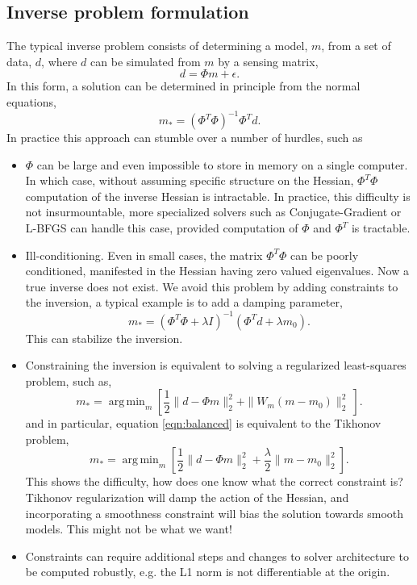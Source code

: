 \documentclass[12pt]{article}
\DeclareMathOperator*{\argmin}{arg\,min}
\begin{document}
\subsection{Inverse problem formulation}\label{sec:foundation}
The typical inverse problem consists of determining a model, $m$, from a set of data, $d$, where $d$ can be simulated from $m$ by a sensing matrix,
\begin{equation}
d=\Phi m + \epsilon.\label{eqn:formulate_d}
\end{equation}
In this form, a solution can be determined in principle from the normal equations,
\begin{equation}
m_{*}=(\Phi^T\Phi)^{-1}\Phi^T d.
\end{equation}
In practice this approach can stumble over a number of hurdles, such as
\begin{itemize}
\item $\Phi$ can be large and even impossible to store in memory on a single computer. In which case, without assuming specific structure on the Hessian, $\Phi^T\Phi$ computation of the inverse Hessian is intractable. In practice, this difficulty is not insurmountable, more specialized solvers such as Conjugate-Gradient or L-BFGS can handle this case, provided computation of $\Phi$ and $\Phi^T$ is tractable.
\item Ill-conditioning. Even in small cases, the matrix $\Phi^T\Phi$ can be poorly conditioned, manifested in the Hessian having zero valued eigenvalues. Now a true inverse does not exist. We avoid this problem by adding constraints to the inversion, a typical example is to add a damping parameter,
\begin{equation}
m_{*}=(\Phi^T\Phi+\lambda I)^{-1}(\Phi^T d+\lambda m_0).\label{eqn:balanced}
\end{equation}
This can stabilize the inversion.
\item Constraining the inversion is equivalent to solving a regularized least-squares problem, such as,
\begin{equation}
m_{*}= \argmin_{m} \left[\frac{1}{2}\| d - \Phi m\|_2^2+ \|W_{m}(m-m_0) \|_2^2\ \right].\label{eqn:genL2}
\end{equation}
and in particular, equation \ref{eqn:balanced} is equivalent to the Tikhonov problem,
\begin{equation}
m_{*}= \argmin_{m} \left[\frac{1}{2}\| d - \Phi m\|_2^2+\frac{\lambda}{2}  \|m-m_0 \|_2^2 \right].\label{eqn:tykhonov}
\end{equation}
This shows the difficulty, how does one know what the correct constraint is? Tikhonov regularization will damp the action of the Hessian, and incorporating a smoothness constraint will bias the solution towards smooth models. This might not be what we want!
\item Constraints can require additional steps and changes to solver architecture to be computed robustly, e.g. the L1 norm is not differentiable at the origin.
\end{itemize}
\end{document}
